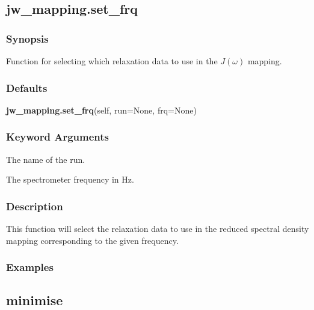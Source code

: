 \newpage

\subsection{jw\_mapping.set\_frq}


\subsubsection{Synopsis}

Function for selecting which relaxation data to use in the $J(\omega)$ mapping.



\subsubsection{Defaults}

\textsf{\textbf{jw\_mapping.set\_frq}(self, run=None, frq=None)}


\subsubsection{Keyword Arguments}

  The name of the run. 

  The spectrometer frequency in Hz. 




\subsubsection{Description}

This function will select the relaxation data to use in the reduced spectral density mapping corresponding to the given frequency.



\subsubsection{Examples}





\newpage

\subsection{minimise}


